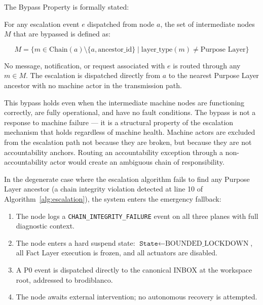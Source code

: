 The Bypass Property is formally stated:

\begin{property}
\label{prop:bypass}
For any escalation event $e$ dispatched from node $a$, the set of intermediate nodes $M$ that are bypassed is defined as:

\begin{equation}
\label{eq:bypass}
M = \{ m \in \text{Chain}(a) \setminus \{a, \text{ancestor\_id}\} \mid \text{layer\_type}(m) \neq \text{Purpose Layer} \}
\end{equation}

No message, notification, or request associated with $e$ is routed through any $m \in M$. The escalation is dispatched directly from $a$ to the nearest Purpose Layer ancestor with no machine actor in the transmission path.
\end{property}

This bypass holds even when the intermediate machine nodes are functioning correctly, are fully operational, and have no fault conditions. The bypass is not a response to machine failure — it is a structural property of the escalation mechanism that holds regardless of machine health. Machine actors are excluded from the escalation path not because they are broken, but because they are not accountability anchors. Routing an accountability exception through a non-accountability actor would create an ambiguous chain of responsibility.

In the degenerate case where the escalation algorithm fails to find any Purpose Layer ancestor (a chain integrity violation detected at line 10 of Algorithm~\ref{alg:escalation}), the system enters the emergency fallback:

\begin{enumerate}[noitemsep]
    \item The node logs a \texttt{CHAIN\_INTEGRITY\_FAILURE} event on all three planes with full diagnostic context.
    \item The node enters a hard suspend state: $\texttt{State} \leftarrow \text{BOUNDED\_LOCKDOWN}$, all Fact Layer execution is frozen, and all actuators are disabled.
    \item A P0 event is dispatched directly to the canonical INBOX at the workspace root, addressed to brodiblanco.
    \item The node awaits external intervention; no autonomous recovery is attempted.
\end{enumerate}

